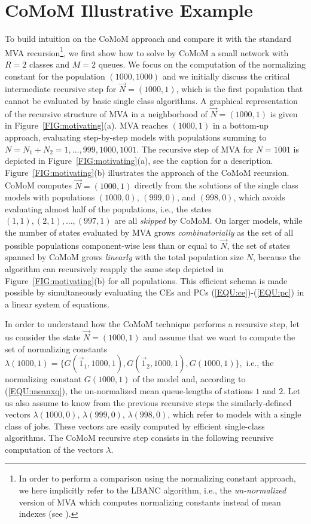 \documentclass[journal,twocolumn,9.5pt]{IEEEtran}
\begin{document}
\section{CoMoM Illustrative Example}
\label{SEC:illustrating}
To build intuition on the CoMoM approach and compare it with the standard MVA recursion\footnote{In order to perform a comparison using the normalizing constant approach, we here implicitly refer to the LBANC algorithm, i.e., the {\em un-normalized} version of MVA which computes normalizing constants instead of mean indexes (see \cite{ChaS80,Lam83}). }, we first show how to solve by CoMoM a small network with $R=2$ classes and $M=2$ queues. We focus on the computation of the normalizing constant for the population $(1000,1000)$ and we initially discuss the critical intermediate recursive step for $\vec N=(1000,1)$, which is the first population that cannot be evaluated by basic single class algorithms.  A graphical representation of the recursive structure of MVA in a neighborhood of $\vec N=(1000,1)$ is given in Figure~\ref{FIG:motivating}(a). MVA reaches $(1000,1)$ in a bottom-up approach, evaluating step-by-step models with populations summing to $N=N_1+N_2=1,\ldots,999,1000,1001$. The recursive step of MVA for $N=1001$ is depicted in Figure~\ref{FIG:motivating}(a), see the caption for a description. Figure~\ref{FIG:motivating}(b) illustrates the approach of the CoMoM recursion. CoMoM computes $\vec N=(1000,1)$ directly from the solutions of the single class models with populations $(1000,0)$, $(999,0)$, and $(998,0)$, which avoids evaluating almost half of the populations, i.e., the states $(1,1),(2,1),\ldots,(997,1)$ are all {\em skipped} by CoMoM. On larger models, while the number of states evaluated by MVA grows \emph{combinatorially} as the set of all possible populations component-wise less than or equal to $\vec N$, the set of states spanned by CoMoM grows \emph{linearly} with the total population size $N$, because the algorithm can recursively reapply the same step depicted in Figure~\ref{FIG:motivating}(b) for all populations. This efficient schema is made possible by simultaneously evaluating the CEs and PCs (\ref{EQU:ce})-(\ref{EQU:pc}) in a linear system of equations. %

In order to understand how the CoMoM technique performs a recursive step, let us consider the state $\vec N=(1000,1)$ and assume that we want to compute the set of normalizing constants
$\lambda(1000,1)=\{G(\vec 1_1,1000,1),G(\vec 1_2,1000,1), G(1000,1)\},$ i.e., the normalizing constant $G(1000,1)$ of the model and, according to (\ref{EQU:meanxq}), the un-normalized mean queue-lengths of stations $1$ and $2$.
Let us also assume to know from the previous recursive steps the similarly-defined vectors $\lambda(1000,0)$, $\lambda(999,0)$, $\lambda(998,0)$, which refer to models with a single class of jobs. These vectors are easily computed by efficient single-class algorithms. The CoMoM recursive step consists in the following recursive computation of the vectors $\lambda$.
\end{document}

